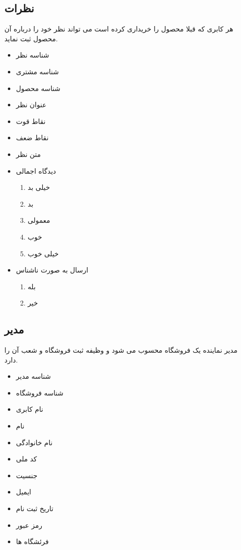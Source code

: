 \documentclass[]{article}
\begin{document}
\subsection{نظرات}
هر کابری که قبلا محصول را خریداری کرده است می تواند نظر خود را درباره آن محصول ثبت نماید.
\begin{itemize}
\item شناسه نظر
\item شناسه مشتری
\item شناسه محصول
\item عنوان نظر
\item نقاط قوت  
\item نقاط ضعف
\item متن نظر
\item دیدگاه اجمالی
\begin{enumerate}
\item خیلی بد
\item بد
\item معمولی
\item  خوب
\item  خیلی خوب
\end{enumerate}
\item ارسال به صورت ناشناس
\begin{enumerate}
\item بله
\item خیر
\end{enumerate}
\end{itemize}





\subsection{مدیر}
مدیر نماینده یک فروشگاه محسوب می شود و وظیفه ثبت فروشگاه و شعب آن را دارد.
\begin{itemize}
\item شناسه مدیر
\item شناسه فروشگاه
\item نام کابری
\item نام
\item نام خانوادگی
\item کد ملی
\item جنسیت
\item ایمیل
\item تاریخ ثبت نام
\item رمز عبور 
\item فرئشگاه ها
\end{itemize}
\end{document}
